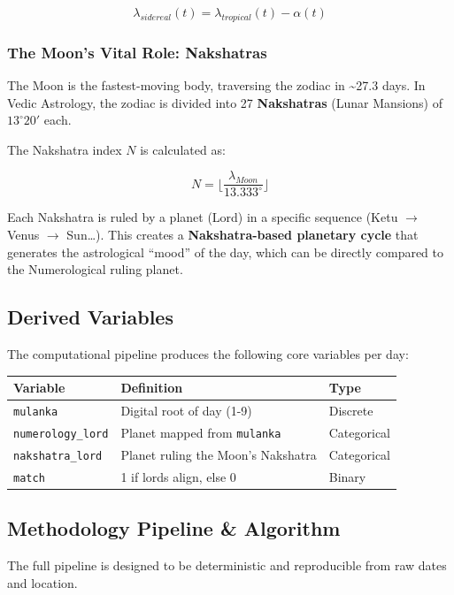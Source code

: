 \documentclass[
  american,
  11pt,
  oneside,
  openany]{article}
\begin{document}
\[
\lambda_{sidereal}(t) = \lambda_{tropical}(t) - \alpha(t)
\]

\subsubsection{The Moon's Vital Role:
Nakshatras}\label{the-moons-vital-role-nakshatras}

The Moon is the fastest-moving body, traversing the zodiac in
\textasciitilde27.3 days. In Vedic Astrology, the zodiac is divided into
27 \textbf{Nakshatras} (Lunar Mansions) of \(13^\circ 20'\) each.

The Nakshatra index \(N\) is calculated as:

\[
N = \lfloor \frac{\lambda_{Moon}}{13.333^\circ} \rfloor
\]

Each Nakshatra is ruled by a planet (Lord) in a specific sequence (Ketu
\(\to\) Venus \(\to\) Sun\ldots). This creates a \textbf{Nakshatra-based
planetary cycle} that generates the astrological ``mood'' of the day,
which can be directly compared to the Numerological ruling planet.

\subsection{Derived Variables}\label{derived-variables}

The computational pipeline produces the following core variables per
day:

\begin{longtable}[]{@{}lll@{}}
\toprule\noalign{}
Variable & Definition & Type \\
\midrule\noalign{}
\endhead
\bottomrule\noalign{}
\endlastfoot
\texttt{mulanka} & Digital root of day (1-9) & Discrete \\
\texttt{numerology\_lord} & Planet mapped from \texttt{mulanka} &
Categorical \\
\texttt{nakshatra\_lord} & Planet ruling the Moon's Nakshatra &
Categorical \\
\texttt{match} & 1 if lords align, else 0 & Binary \\
\end{longtable}

\subsection{Methodology Pipeline \&
Algorithm}\label{methodology-pipeline-algorithm}

The full pipeline is designed to be deterministic and reproducible from
raw dates and location.
\end{document}
